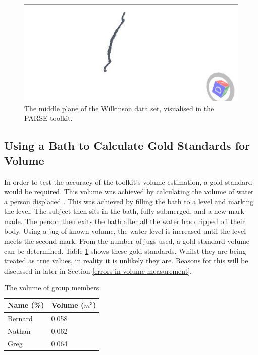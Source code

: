\begin{figure}[!htb]
\begin{center}
\includegraphics[scale=0.4]{images/wilko3} 
\end{center}
\caption{The middle plane of the Wilkinson data set, visualised in the PARSE toolkit.}
\label{fig:The middle plane of the wilkinson data set, visualised in the parse toolkit.}
\end{figure}

\subsection{Using a Bath to Calculate Gold Standards for Volume}
In order to test the accuracy of the toolkit's volume estimation, a gold standard would be required. This volume was achieved by calculating the volume of water a person displaced \cite{katch1967}. This was achieved by filling the bath to a level and marking the level. The subject then sits in the bath, fully submerged, and a new mark made. The person then exits the bath after all the water has dripped off their body. Using a jug \cite{beynon1989} of known volume, the water level is increased until the level meets the second mark. From the number of jugs used, a gold standard volume can be determined. Table \ref{the volume of group members} shows these gold standards. Whilst they are being treated as true values, in reality it is unlikely they are. Reasons for this will be discussed in later in Section \ref{errors in volume measurement}.\\

\begin{table}[!htb]
\begin{center}
  \begin{tabular}{| l | l |}
    \hline
    Name (\%) & Volume ($m^3$)\\ \hline
    Bernard & 0.058\\ \hline
    Nathan & 0.062\\ \hline
    Greg & 0.064\\ \hline
  \end{tabular}
\end{center}
\caption{The volume of group members}
\label{the volume of group members}
\end{table}

